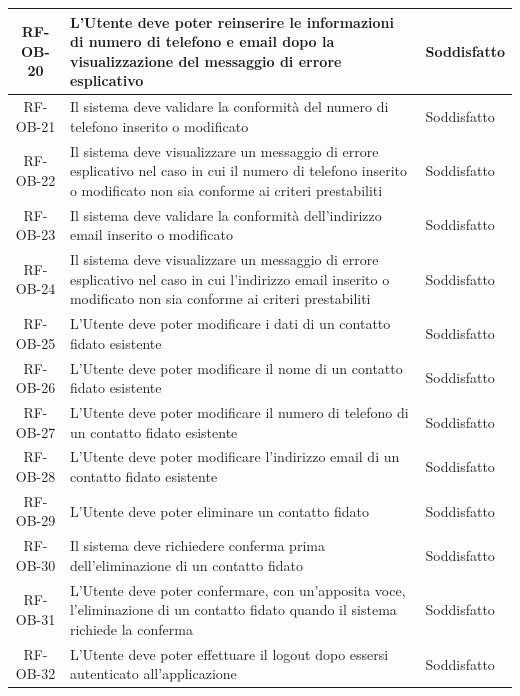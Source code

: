 \documentclass[a4paper,12pt]{article}
\begin{document}
\begin{center}
\begin{longtable}{|c|p{8.5cm}|>{\centering\arraybackslash}p{4cm}|}
RF-OB-20 & L'Utente deve poter reinserire le informazioni di numero di telefono e email dopo la visualizzazione del messaggio di errore esplicativo & Soddisfatto \\
\hline

RF-OB-21 & Il sistema deve validare la conformità del numero di telefono inserito o modificato & Soddisfatto \\
\hline

RF-OB-22 & Il sistema deve visualizzare un messaggio di errore esplicativo nel caso in cui il numero di telefono inserito o modificato non sia conforme ai criteri prestabiliti & Soddisfatto \\
\hline

RF-OB-23 & Il sistema deve validare la conformità dell'indirizzo email inserito o modificato & Soddisfatto \\
\hline

RF-OB-24 & Il sistema deve visualizzare un messaggio di errore esplicativo nel caso in cui l'indirizzo email inserito o modificato non sia conforme ai criteri prestabiliti & Soddisfatto \\
\hline

RF-OB-25 & L'Utente deve poter modificare i dati di un contatto fidato esistente & Soddisfatto \\
\hline

RF-OB-26 & L'Utente deve poter modificare il nome di un contatto fidato esistente & Soddisfatto \\
\hline

RF-OB-27 & L'Utente deve poter modificare il numero di telefono di un contatto fidato esistente & Soddisfatto \\
\hline

RF-OB-28 & L'Utente deve poter modificare l'indirizzo email di un contatto fidato esistente & Soddisfatto \\
\hline

RF-OB-29 & L'Utente deve poter eliminare un contatto fidato & Soddisfatto \\
\hline

RF-OB-30 & Il sistema deve richiedere conferma prima dell'eliminazione di un contatto fidato & Soddisfatto \\
\hline

RF-OB-31 & L'Utente deve poter confermare, con un'apposita voce, l'eliminazione di un contatto fidato quando il sistema richiede la conferma & Soddisfatto \\
\hline

RF-OB-32 & L'Utente deve poter effettuare il logout dopo essersi autenticato all'applicazione & Soddisfatto \\
\hline


\end{longtable}
\end{center}
\end{document}
